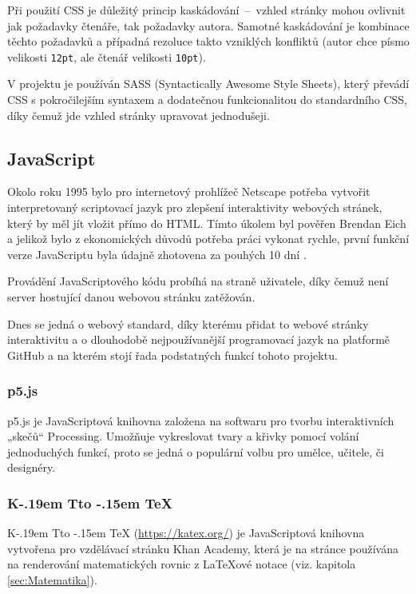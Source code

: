 \documentclass[a4paper, 12pt]{article}
\makeatletter
\DeclareRobustCommand{\KaTeX}{%
  K\kern -.19em
  {\sbox \z@ T\vbox to\ht \z@ {\hbox{%
  \check@mathfonts
  \fontsize\sf@size\z@
  \selectfont A}%
  \vss}%
}\kern -.15em
\TeX}
\makeatother
\begin{document}
  Při použití CSS je důležitý princip kaskádování~--~vzhled stránky mohou ovlivnit jak požadavky čtenáře, tak požadavky autora. Samotné kaskádování je kombinace těchto požadavků a případná rezoluce takto vzniklých konfliktů (autor chce písmo velikosti \texttt{12pt}, ale čtenář velikosti \texttt{10pt}).

  V projektu je používán SASS (Syntactically Awesome Style Sheets), který převádí CSS s pokročilejším syntaxem a dodatečnou funkcionalitou do standardního CSS, díky čemuž jde vzhled stránky upravovat jednodušeji.


  \subsection{JavaScript}
  Okolo roku 1995 bylo pro internetový prohlížeč Netscape potřeba vytvořit interpretovaný scriptovací jazyk pro zlepšení interaktivity webových stránek, který by měl jít vložit přímo do HTML. Tímto úkolem byl pověřen Brendan Eich a jelikož bylo z ekonomických důvodů potřeba práci vykonat rychle, první funkční verze JavaScriptu byla údajně zhotovena za pouhých 10 dní \cite{the-origin-of-javascript}.

  Provádění JavaScriptového kódu probíhá na straně uživatele, díky čemuž není server hostující danou webovou stránku zatěžován. %

  Dnes se jedná o webový standard, díky kterému přidat to webové stránky interaktivitu a o dlouhodobě nejpoužívanější programovací jazyk na platformě GitHub \cite{github-statistics} a na kterém stojí řada podstatných funkcí tohoto projektu.


  \subsubsection{p5.js} \label{sec:p5.js}
  p5.js je JavaScriptová knihovna založena na softwaru pro tvorbu interaktivních „skečů“ Processing. Umožňuje vykreslovat tvary a křivky pomocí volání jednoduchých funkcí, proto se jedná o populární volbu pro umělce, učitele, či designéry.


  \subsubsection{\texorpdfstring{\KaTeX}{KaTeX}} \label{sec:KaTeX}
  \KaTeX{} (\url{https://katex.org/}) je JavaScriptová knihovna vytvořena pro vzdělávací stránku Khan Academy, která je na stránce používána na renderování matematických rovnic z \LaTeX ové notace (viz. kapitola \ref{sec:Matematika}).
\end{document}
